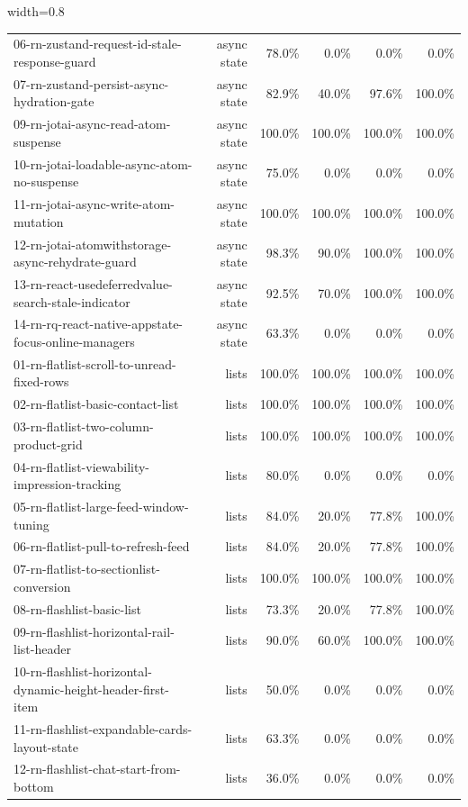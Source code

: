 \begin{table}[htbp]
\begin{adjustbox}{width=0.8\textwidth}
\begin{tabular}{lrrrrr}
06-rn-zustand-request-id-stale-response-guard & async state & 78.0\% & 0.0\% & 0.0\% & 0.0\% \\
07-rn-zustand-persist-async-hydration-gate & async state & 82.9\% & 40.0\% & 97.6\% & 100.0\% \\
09-rn-jotai-async-read-atom-suspense & async state & 100.0\% & 100.0\% & 100.0\% & 100.0\% \\
10-rn-jotai-loadable-async-atom-no-suspense & async state & 75.0\% & 0.0\% & 0.0\% & 0.0\% \\
11-rn-jotai-async-write-atom-mutation & async state & 100.0\% & 100.0\% & 100.0\% & 100.0\% \\
12-rn-jotai-atomwithstorage-async-rehydrate-guard & async state & 98.3\% & 90.0\% & 100.0\% & 100.0\% \\
13-rn-react-usedeferredvalue-search-stale-indicator & async state & 92.5\% & 70.0\% & 100.0\% & 100.0\% \\
14-rn-rq-react-native-appstate-focus-online-managers & async state & 63.3\% & 0.0\% & 0.0\% & 0.0\% \\
01-rn-flatlist-scroll-to-unread-fixed-rows & lists & 100.0\% & 100.0\% & 100.0\% & 100.0\% \\
02-rn-flatlist-basic-contact-list & lists & 100.0\% & 100.0\% & 100.0\% & 100.0\% \\
03-rn-flatlist-two-column-product-grid & lists & 100.0\% & 100.0\% & 100.0\% & 100.0\% \\
04-rn-flatlist-viewability-impression-tracking & lists & 80.0\% & 0.0\% & 0.0\% & 0.0\% \\
05-rn-flatlist-large-feed-window-tuning & lists & 84.0\% & 20.0\% & 77.8\% & 100.0\% \\
06-rn-flatlist-pull-to-refresh-feed & lists & 84.0\% & 20.0\% & 77.8\% & 100.0\% \\
07-rn-flatlist-to-sectionlist-conversion & lists & 100.0\% & 100.0\% & 100.0\% & 100.0\% \\
08-rn-flashlist-basic-list & lists & 73.3\% & 20.0\% & 77.8\% & 100.0\% \\
09-rn-flashlist-horizontal-rail-list-header & lists & 90.0\% & 60.0\% & 100.0\% & 100.0\% \\
10-rn-flashlist-horizontal-dynamic-height-header-first-item & lists & 50.0\% & 0.0\% & 0.0\% & 0.0\% \\
11-rn-flashlist-expandable-cards-layout-state & lists & 63.3\% & 0.0\% & 0.0\% & 0.0\% \\
12-rn-flashlist-chat-start-from-bottom & lists & 36.0\% & 0.0\% & 0.0\% & 0.0\% \\

\end{tabular}
\end{adjustbox}
\end{table}

